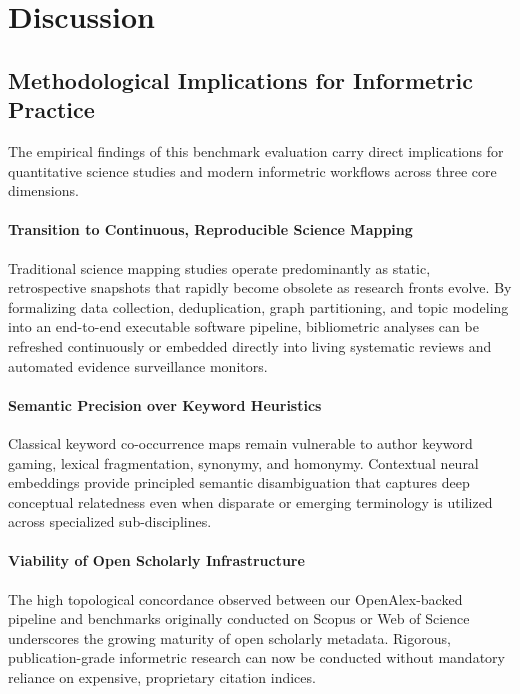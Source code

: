 \documentclass[preprint,12pt]{elsarticle}
\begin{document}
\section{Discussion}
\label{sec:discussion}
\subsection{Methodological Implications for Informetric Practice}
The empirical findings of this benchmark evaluation carry direct implications for quantitative science studies and modern informetric workflows across three core dimensions.

\paragraph{Transition to Continuous, Reproducible Science Mapping}
Traditional science mapping studies operate predominantly as static, retrospective snapshots that rapidly become obsolete as research fronts evolve. By formalizing data collection, deduplication, graph partitioning, and topic modeling into an end-to-end executable software pipeline, bibliometric analyses can be refreshed continuously or embedded directly into living systematic reviews and automated evidence surveillance monitors.

\paragraph{Semantic Precision over Keyword Heuristics}
Classical keyword co-occurrence maps remain vulnerable to author keyword gaming, lexical fragmentation, synonymy, and homonymy. Contextual neural embeddings provide principled semantic disambiguation that captures deep conceptual relatedness even when disparate or emerging terminology is utilized across specialized sub-disciplines.

\paragraph{Viability of Open Scholarly Infrastructure}
The high topological concordance observed between our OpenAlex-backed pipeline and benchmarks originally conducted on Scopus or Web of Science underscores the growing maturity of open scholarly metadata. Rigorous, publication-grade informetric research can now be conducted without mandatory reliance on expensive, proprietary citation indices.
\end{document}
